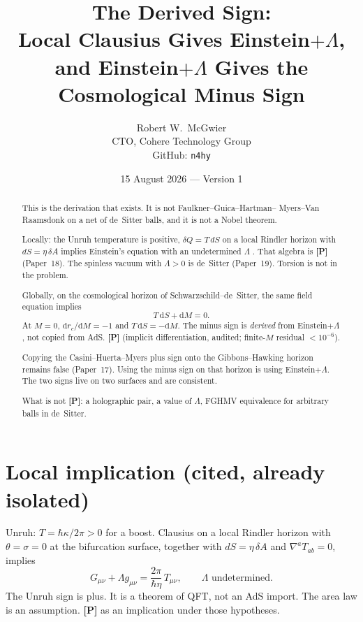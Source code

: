 \documentclass[11pt]{article}
\title{\textbf{The Derived Sign:\\
Local Clausius Gives Einstein$+\Lambda$,\\
and Einstein$+\Lambda$ Gives the Cosmological Minus Sign}}
\author{Robert W.\ McGwier\\
\small CTO, Cohere Technology Group\\
\small GitHub: \texttt{n4hy}}
\date{15 August 2026 --- Version 1}
\newcommand{\pP}{\textbf{[P]}}
\begin{document}
\maketitle

\begin{abstract}
\noindent
This is the derivation that exists. It is not Faulkner--Guica--Hartman--
Myers--Van Raamsdonk on a net of de~Sitter balls, and it is not a
Nobel theorem.

Locally: the Unruh temperature is positive, $\delta Q=T\,dS$ on a
local Rindler horizon with $dS=\eta\,\delta A$ implies Einstein's
equation with an undetermined $\Lambda$ \cite{Jacobson1995}. That
algebra is \pP{} (Paper~18). The spinless vacuum with $\Lambda>0$
is de~Sitter (Paper~19). Torsion is not in the problem.

Globally, on the cosmological horizon of Schwarzschild--de~Sitter,
the same field equation implies
\begin{equation*}
T\,\mathrm{d}S+\mathrm{d}M=0.
\end{equation*}
At $M=0$, $\mathrm{d}r_c/\mathrm{d}M=-1$ and
$T\,\mathrm{d}S=-\mathrm{d}M$. The minus sign is \emph{derived}
from Einstein$+\Lambda$, not copied from AdS. \pP{} (implicit
differentiation, audited; finite-$M$ residual $<10^{-6}$).

Copying the Casini--Huerta--Myers plus sign onto the Gibbons--Hawking
horizon remains false (Paper~17). Using the minus sign on that
horizon is using Einstein$+\Lambda$. The two signs live on two
surfaces and are consistent.

What is not \pP{}: a holographic pair, a value of $\Lambda$,
FGHMV equivalence for arbitrary balls in de~Sitter.
\end{abstract}

\section{Local implication (cited, already isolated)}

Unruh: $T=\hbar\kappa/2\pi>0$ for a boost. Clausius on a local
Rindler horizon with $\theta=\sigma=0$ at the bifurcation surface,
together with $dS=\eta\,\delta A$ and $\nabla^a T_{ab}=0$, implies
\cite{Jacobson1995,McGwierXVIII}
\begin{equation}
G_{\mu\nu}+\Lambda g_{\mu\nu}
=
\frac{2\pi}{\hbar\eta}\,T_{\mu\nu},
\qquad
\Lambda\text{ undetermined}.
\label{eq:loc}
\end{equation}
The Unruh sign is plus. It is a theorem of QFT, not an AdS import.
The area law is an assumption. \pP{} as an implication under those
hypotheses.
\end{document}
